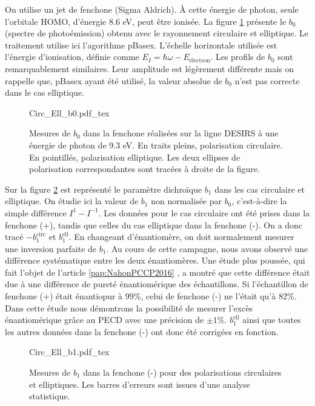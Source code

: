 On utilise un jet de fenchone (Sigma Aldrich). \`{A} cette énergie de photon, seule l'orbitale HOMO, d'énergie 8.6 eV, peut être ionisée. La figure \ref{fig:circ_ell_b0} présente le $b_0$ (spectre de photoémission) obtenu avec le rayonnement circulaire et elliptique. Le traitement utilise ici l'agorithme pBasex. L'échelle horizontale utilisée est l'énergie d'ionisation, définie comme $E_I = \hbar\omega - E_{\text{\'electron}}$. Les profils de $b_0$ sont remarquablement similaires. Leur amplitude est légèrement différente mais on rappelle que, pBasex ayant été utilisé, la valeur absolue de $b_0$ n'est pas correcte dans le cas elliptique.

\begin{figure}[!ht]
\centering
\def\svgwidth{0.8\columnwidth}
{Circ_Ell_b0.pdf_tex}
\caption{Mesures de $b_0$ dans la fenchone réalisées sur la ligne DESIRS à une énergie de photon de 9.3 eV. En traits pleins, polarisation circulaire. En pointillés, polarisation elliptique. Les deux ellipses de polarisation correspondantes sont tracées à droite de la figure.}
\label{fig:circ_ell_b0}
\end{figure}

Sur la figure \ref{fig:circ_ell_b1} est représenté le paramètre dichroïque $b_1$ dans les cas circulaire et elliptique. On étudie ici la valeur de $b_1$ non normalisée par $b_0$, c'est-à-dire la simple différence $I^1-I^{-1}$. Les données pour le cas circulaire ont été prises dans la fenchone (+), tandis que celles du cas elliptique dans la fenchone (-). On a donc tracé $-b_1^{\text{circ}}$ et $b_1^{\text{ell}}$. En changeant d'énantiomère, on doit normalement mesurer une inversion parfaite de $b_1$. Au cours de cette campagne, nous avons observé une différence systématique entre les deux énantiomères. Une étude plus poussée, qui fait l'objet de l'article \ref{pap:NahonPCCP2016} , a montré que cette différence était due à une différence de pureté énantiomérique des échantillons. Si l'échantillon de fenchone (+) était énantiopur à 99\%, celui de fenchone (-) ne l'était qu'à 82\%. Dans cette étude nous démontrons la possibilité de mesurer l'excès énantiomérique grâce au PECD avec une précision de $\pm1$\%. $b_1^{\text{ell}}$ ainsi que toutes les autres données dans la fenchone (-) ont donc été corrigées en fonction.

\begin{figure}[!ht]
\centering
\def\svgwidth{0.8\columnwidth}
{Circ_Ell_b1.pdf_tex}
\caption{Mesures de $b_1$ dans la fenchone (-) pour des polarisations circulaires et elliptiques. Les barres d'erreurs sont issues d'une analyse statistique.}
\label{fig:circ_ell_b1}
\end{figure}

